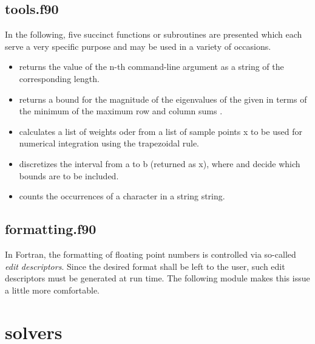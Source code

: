 

\subsection{tools.f90}

In the following, five succinct functions or subroutines are presented which
each serve a very specific purpose and may be used in a variety of occasions.
%
\begin{itemize}
    \item {}
        returns the value of the \code n-th command-line argument as a string of
        the corresponding length.
    \item {}
        returns a bound for the magnitude of the eigenvalues of the given
         in terms of the minimum of the maximum row and column sums
        \cite[Eqs.~1.1, 1.2]{Wolkowicz80}.
    \item {}
        calculates a list of weights oder   from a
        list of sample points \code x to be used for numerical integration using
        the trapezoidal rule.
    \item {}
        discretizes the interval from \code a to \code b (returned as \code x),
        where  and  decide which bounds are to be
        included.
    \item {}
        counts the occurrences of a character in a string string.
\end{itemize}



\subsection{formatting.f90}

In Fortran, the formatting of floating point numbers is controlled via so-called
\emph{edit descriptors}. Since the desired format shall be left to the user,
such edit descriptors must be generated at run time. The following module makes
this issue a little more comfortable.



\section{ solvers}

